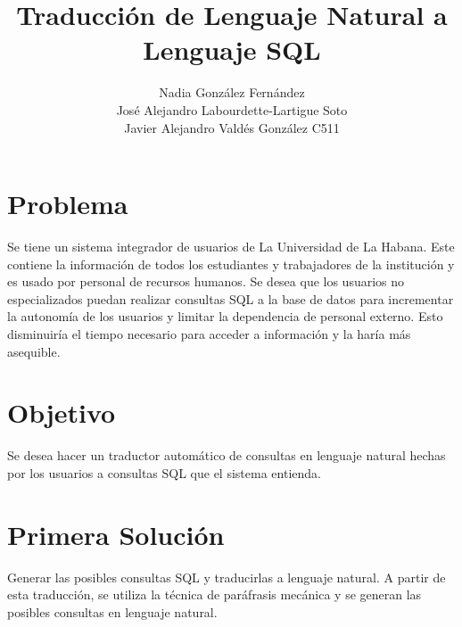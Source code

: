 \documentclass[runningheads,a4paper]{llncs}
\begin{document}
	
	\mainmatter 
	\title{Traducción de Lenguaje Natural a Lenguaje SQL}
	\author{Nadia González Fernández \\ José Alejandro Labourdette-Lartigue Soto \\ Javier Alejandro Valdés González C511}
	\maketitle

	
	\section{Problema}
	Se tiene un sistema integrador de usuarios de La Universidad de La Habana. Este contiene la informaci\'on de todos los estudiantes y trabajadores de la instituci\'on y es usado por personal de recursos humanos. Se desea que los usuarios no especializados puedan realizar  consultas SQL a la base de datos para incrementar la autonom\'ia de los usuarios y limitar la dependencia de personal externo. Esto disminuir\'ia el tiempo necesario para acceder a informaci\'on y la har\'ia m\'as asequible.


	\section{Objetivo}
	Se desea hacer un traductor autom\'atico de consultas en lenguaje natural hechas por los usuarios a consultas SQL que el sistema entienda.
	
	\section{Primera Soluci\'on}
	Generar las posibles consultas SQL y traducirlas a lenguaje natural. A partir de esta traducci\'on, se utiliza la t\'ecnica de par\'afrasis mec\'anica y se generan las posibles consultas en lenguaje natural.
	
\end{document}
